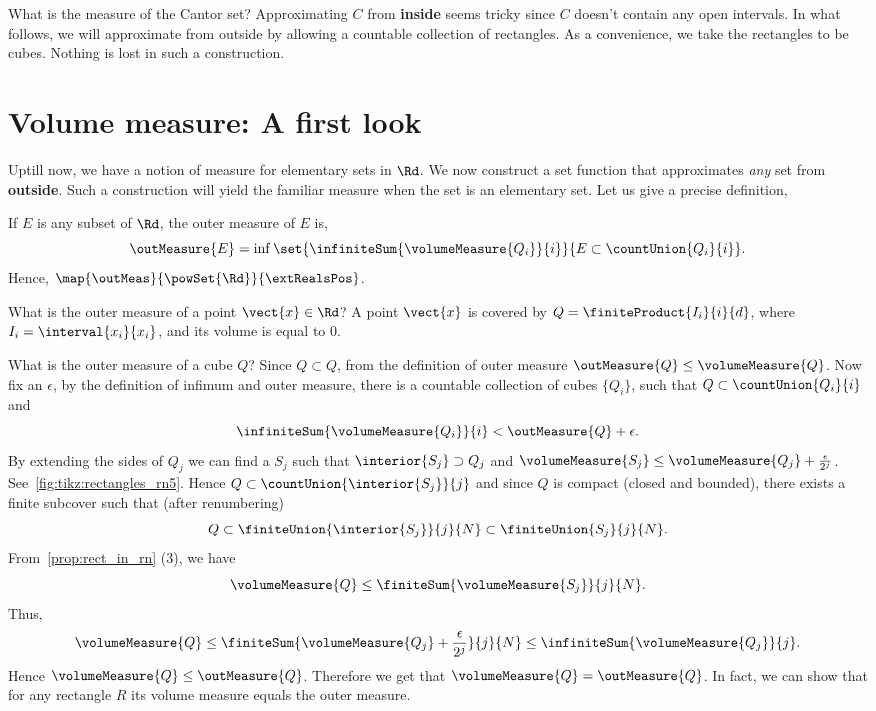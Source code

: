 What is the measure of the Cantor set? Approximating $C$ from \textbf{inside} seems tricky since $C$ doesn't
contain any open intervals. In what follows, we will approximate from outside by allowing a countable
collection of rectangles. As a convenience, we take the rectangles to be cubes. Nothing is lost in such a
construction.

\section{Volume measure: A first look}
Uptill now, we have a notion of measure for elementary sets in $\Rd$. We now construct a set function that
approximates \emph{any} set from \textbf{outside}. Such a construction will yield the familiar measure when
the set is an elementary set. Let us give a precise definition,
\begin{Definition}[name=Outer (volume) measure]
    If $E$ is any subset of $\Rd$, the outer measure of $E$ is,
    \[\outMeasure{E} = \inf\set{\infiniteSum{\volumeMeasure{Q_i}}{i}}{E\subset\countUnion{Q_i}{i}}.\]
    Hence,
    $\map{\outMeas}{\powSet{\Rd}}{\extRealsPos}$.
\end{Definition}
\begin{Example}
    What is the outer measure of a point $\vect{x}\in\Rd$? A point $\vect{x}$ is covered by $Q =
    \finiteProduct{I_i}{i}{d}$,
    where $I_i = \interval{x_i}{x_i}$, and its volume is equal to $0$.
\end{Example}
\begin{Example}
    What is the outer measure of a cube $Q$? Since $Q \subset Q$, from the definition of outer measure
    $\outMeasure{Q} \leq \volumeMeasure{Q}$. Now fix an $\epsilon$, by the definition of infimum and outer
    measure, there is a
    countable collection of cubes $\lbrace Q_i \rbrace$, such that $Q \subset \countUnion{Q_i}{i}$ and
    \[\infiniteSum{\volumeMeasure{Q_i}}{i} < \outMeasure{Q} + \epsilon.\]
    By extending the sides of $Q_j$ we can find a $S_j$ such that $\interior{S_j}\supset Q_j$ and
    $\volumeMeasure{S_j} \leq \volumeMeasure{Q_j} + \frac{\epsilon}{2^j}$. See~\ref{fig:tikz:rectangles_rn5}.
    Hence $Q \subset
    \countUnion{\interior{S_j}}{j}$ and since $Q$ is compact (closed and bounded), there exists a finite
    subcover such that (after renumbering)
    \[Q \subset \finiteUnion{\interior{S_j}}{j}{N} \subset \finiteUnion{S_j}{j}{N}.\]
    From~\ref{prop:rect_in_rn} (3), we have
    \[\volumeMeasure{Q} \leq \finiteSum{\volumeMeasure{S_j}}{j}{N}.\]
    Thus,
    \[\volumeMeasure{Q} \leq \finiteSum{\volumeMeasure{Q_j}+\frac{\epsilon}{2^j}}{j}{N} \leq
	\infiniteSum{\volumeMeasure{Q_j}}{j}.\]
    Hence $\volumeMeasure{Q} \leq \outMeasure{Q}$. Therefore we get that $\volumeMeasure{Q} =
    \outMeasure{Q}$. In fact, we can show that for any rectangle $R$ its volume measure equals the outer
    measure.
\end{Example}
